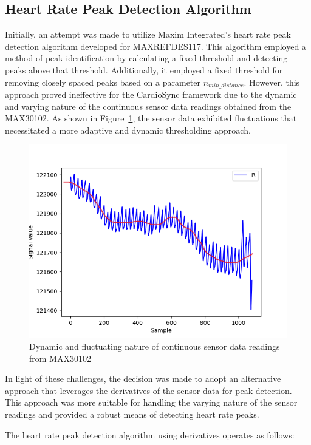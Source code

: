\subsection{Heart Rate Peak Detection Algorithm}
\label{sec:heart_rate_algo_impl}
Initially, an attempt was made to utilize Maxim Integrated's heart rate peak detection algorithm developed for MAXREFDES117. This algorithm employed a method of peak identification by calculating a fixed threshold and detecting peaks above that threshold. Additionally, it employed a fixed threshold for removing closely spaced peaks based on a parameter \(n_{min\_distance}\). However, this approach proved ineffective for the CardioSync framework due to the dynamic and varying nature of the continuous sensor data readings obtained from the MAX30102. As shown in Figure~\ref{fig:dynamic_threshold}, the sensor data exhibited fluctuations that necessitated a more adaptive and dynamic thresholding approach.

\begin{figure}[H]
    \centering
    \includegraphics[width=0.7\linewidth]{chapters/Implementation/dynamic_threshold.png}
    \caption{Dynamic and fluctuating nature of continuous sensor data readings from MAX30102}
    \label{fig:dynamic_threshold}
\end{figure}

\noindent In light of these challenges, the decision was made to adopt an alternative approach that leverages the derivatives of the sensor data for peak detection. This approach was more suitable for handling the varying nature of the sensor readings and provided a robust means of detecting heart rate peaks.

\noindent The heart rate peak detection algorithm using derivatives operates as follows:

